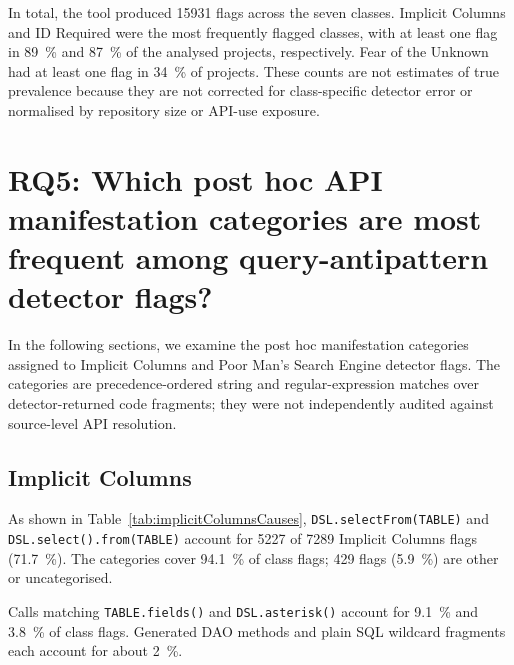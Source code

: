 In total, the tool produced \num{15931} flags across the seven classes. Implicit Columns and ID Required were the most frequently flagged classes, with at least one flag in \qty{89}{\percent} and \qty{87}{\percent} of the analysed projects, respectively. Fear of the Unknown had at least one flag in \qty{34}{\percent} of projects. These counts are not estimates of true prevalence because they are not corrected for class-specific detector error or normalised by repository size or API-use exposure.

\section{RQ5: Which post hoc API manifestation categories are most frequent among query-antipattern detector flags?}\label{sec:resultsRQ5}

In the following sections, we examine the post hoc manifestation categories assigned to Implicit Columns and Poor Man's Search Engine detector flags. The categories are precedence-ordered string and regular-expression matches over detector-returned code fragments; they were not independently audited against source-level API resolution.

\subsection{Implicit Columns}

As shown in Table~\ref{tab:implicitColumnsCauses}, \texttt{DSL.selectFrom(TABLE)} and \texttt{DSL.select().from(TABLE)} account for \num{5227} of \num{7289} Implicit Columns flags (\qty{71.7}{\percent}). The categories cover \qty{94.1}{\percent} of class flags; \num{429} flags (\qty{5.9}{\percent}) are other or uncategorised.

Calls matching \texttt{TABLE.fields()} and \texttt{DSL.asterisk()} account for \qty{9.1}{\percent} and \qty{3.8}{\percent} of class flags. Generated DAO methods and plain SQL wildcard fragments each account for about \qty{2}{\percent}.

